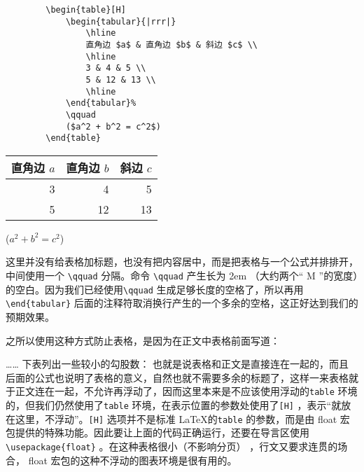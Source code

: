 \begin{minipage}[t]{0.45\textwidth}
    \begin{lstlisting}
        \begin{table}[H]
            \begin{tabular}{|rrr|}
                \hline
                直角边 $a$ & 直角边 $b$ & 斜边 $c$ \\ 
                \hline
                3 & 4 & 5 \\ 
                5 & 12 & 13 \\ 
                \hline
            \end{tabular}%
            \qquad
            ($a^2 + b^2 = c^2$)
        \end{table}
    \end{lstlisting}
\end{minipage}
\hfill
\begin{minipage}[t]{0.45\textwidth}
    \vspace{0.1cm}
    \hspace{0.5cm}
    \begin{table}[H]
        \begin{tabular}{|rrr|}
            \hline
            直角边 $a$ & 直角边 $b$ & 斜边 $c$ \\ 
            \hline
            3 & 4 & 5 \\ 
            5 & 12 & 13 \\ 
            \hline
        \end{tabular}%
        \qquad
        ($a^2 + b^2 = c^2$)
    \end{table}
\end{minipage}

这里并没有给表格加标题，也没有把内容居中，而是把表格与一个公式并排排开，中间使用一个 \verb|\qquad| 分隔。命令 \verb|\qquad| 产生长为 2em （大约两个“ M ”的宽度）的空白。因为我们已经使用\verb|\qquad| 生成足够长度的空格了，所以再用\verb|\end{tabular}| 后面的注释符取消换行产生的一个多余的空格，这正好达到我们的预期效果。

之所以使用这种方式防止表格，是因为在正文中表格前面写道：

{\qquad \heiti {} …… 下表列出一些较小的勾股数：}
也就是说表格和正文是直接连在一起的，而且后面的公式也说明了表格的意义，自然也就不需要多余的标题了，这样一来表格就于正文连在一起，不允许再浮动了，因而这里本来是不应该使用浮动的\verb|table| 环境的，但我们仍然使用了\verb|table| 环境，在表示位置的参数处使用了\verb|[H]| ，表示“就放在这里，不浮动”。\verb|[H]| 选项并不是标准 \LaTeX 的\verb|table| 的参数，而是由 float 宏包提供的特殊功能。因此要让上面的代码正确运行，还要在导言区使用\verb|\usepackage{float}| 。在这种表格很小（不影响分页） ，行文又要求连贯的场合， float 宏包的这种不浮动的图表环境是很有用的。

